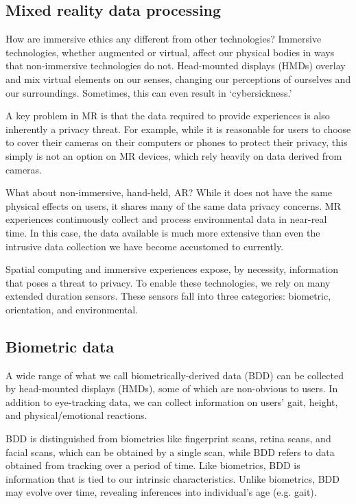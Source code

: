 \subsection{Mixed reality data processing}\label{sec:data}

How are immersive ethics any different from other technologies? Immersive technologies, whether augmented or virtual, affect our physical bodies in ways that non-immersive technologies do not. Head-mounted displays (HMDs) overlay and mix virtual elements on our senses, changing our perceptions of ourselves and our surroundings. Sometimes, this can even result in `cybersickness.'

A key problem in MR is that the data required to provide experiences is also inherently a privacy threat. For example, while it is reasonable for users to choose to cover their cameras on their computers or phones to protect their privacy, this simply is not an option on MR devices, which rely heavily on data derived from cameras.

What about non-immersive, hand-held, AR? While it does not have the same physical effects on users, it shares many of the same data privacy concerns. MR experiences continuously collect and process environmental data in near-real time. In this case, the data available is much more extensive than even the intrusive data collection we have become accustomed to currently.

Spatial computing and immersive experiences expose, by necessity, information that poses a threat to privacy. To enable these technologies, we rely on many extended duration sensors. These sensors fall into three categories: biometric, orientation, and environmental.

\subsection{Biometric data}\label{sec:biometrics}
A wide range of what we call biometrically-derived data (BDD) can be collected by head-mounted displays (HMDs), some of which are non-obvious to users. In addition to eye-tracking data, we can collect information on users' gait, height, and physical/emotional reactions.

BDD is distinguished from biometrics like fingerprint scans, retina scans, and facial scans, which can be obtained by a single scan, while BDD refers to data obtained from tracking over a period of time. Like biometrics, BDD is information that is tied to our intrinsic characteristics. Unlike biometrics, BDD may evolve over time, revealing inferences into individual's age (e.g. gait).

